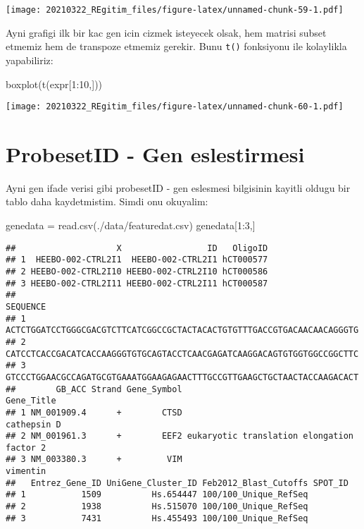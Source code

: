 \documentclass[
]{book}
\newenvironment{Shaded}{\begin{snugshade}}{\end{snugshade}}
\newcommand{\DecValTok}[1]{\textcolor[rgb]{0.00,0.00,0.81}{#1}}
\newcommand{\FunctionTok}[1]{\textcolor[rgb]{0.00,0.00,0.00}{#1}}
\newcommand{\NormalTok}[1]{#1}
\newcommand{\OtherTok}[1]{\textcolor[rgb]{0.56,0.35,0.01}{#1}}
\newcommand{\SpecialCharTok}[1]{\textcolor[rgb]{0.00,0.00,0.00}{#1}}
\newcommand{\StringTok}[1]{\textcolor[rgb]{0.31,0.60,0.02}{#1}}
\begin{document}
\texttt{[image: 20210322\_REgitim\_files/figure-latex/unnamed-chunk-59-1.pdf]}

Ayni grafigi ilk bir kac gen icin cizmek isteyecek olsak, hem matrisi subset etmemiz hem de transpoze etmemiz gerekir. Bunu \texttt{t()} fonksiyonu ile kolaylikla yapabiliriz:

\begin{Shaded}
\begin{Highlighting}[]
\FunctionTok{boxplot}\NormalTok{(}\FunctionTok{t}\NormalTok{(expr[}\DecValTok{1}\SpecialCharTok{:}\DecValTok{10}\NormalTok{,]))}
\end{Highlighting}
\end{Shaded}

\texttt{[image: 20210322\_REgitim\_files/figure-latex/unnamed-chunk-60-1.pdf]}

\hypertarget{probesetid---gen-eslestirmesi}{%
\section{ProbesetID - Gen eslestirmesi}\label{probesetid---gen-eslestirmesi}}

Ayni gen ifade verisi gibi probesetID - gen eslesmesi bilgisinin kayitli oldugu bir tablo daha kaydetmistim. Simdi onu okuyalim:

\begin{Shaded}
\begin{Highlighting}[]
\NormalTok{genedata }\OtherTok{=} \FunctionTok{read.csv}\NormalTok{(}\StringTok{\textquotesingle{}./data/featuredat.csv\textquotesingle{}}\NormalTok{)}
\NormalTok{genedata[}\DecValTok{1}\SpecialCharTok{:}\DecValTok{3}\NormalTok{,]}
\end{Highlighting}
\end{Shaded}

\begin{verbatim}
##                    X                 ID   OligoID
## 1  HEEBO-002-CTRL2I1  HEEBO-002-CTRL2I1 hCT000577
## 2 HEEBO-002-CTRL2I10 HEEBO-002-CTRL2I10 hCT000586
## 3 HEEBO-002-CTRL2I11 HEEBO-002-CTRL2I11 hCT000587
##                                                                 SEQUENCE
## 1 ACTCTGGATCCTGGGCGACGTCTTCATCGGCCGCTACTACACTGTGTTTGACCGTGACAACAACAGGGTG
## 2 CATCCTCACCGACATCACCAAGGGTGTGCAGTACCTCAACGAGATCAAGGACAGTGTGGTGGCCGGCTTC
## 3 GTCCCTGGAACGCCAGATGCGTGAAATGGAAGAGAACTTTGCCGTTGAAGCTGCTAACTACCAAGACACT
##        GB_ACC Strand Gene_Symbol                                 Gene_Title
## 1 NM_001909.4      +        CTSD                                cathepsin D
## 2 NM_001961.3      +        EEF2 eukaryotic translation elongation factor 2
## 3 NM_003380.3      +         VIM                                   vimentin
##   Entrez_Gene_ID UniGene_Cluster_ID Feb2012_Blast_Cutoffs SPOT_ID
## 1           1509          Hs.654447 100/100_Unique_RefSeq        
## 2           1938          Hs.515070 100/100_Unique_RefSeq        
## 3           7431          Hs.455493 100/100_Unique_RefSeq
\end{verbatim}
\end{document}
